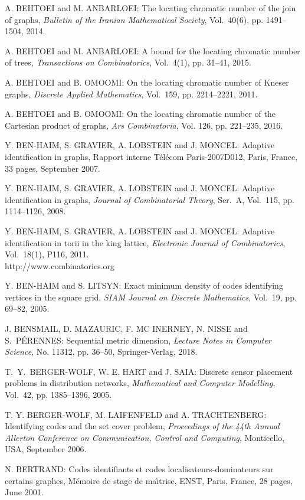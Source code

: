 \begin{thebibliography}{999}
A. BEHTOEI and M. ANBARLOEI: The locating chromatic number of the join of graphs, {\it Bulletin of the Iranian Mathematical Society}, Vol.~40(6), pp. 1491--1504, 2014.

A. BEHTOEI and M. ANBARLOEI: A bound for the locating chromatic number of trees, {\it Transactions on Combinatorics}, Vol.~4(1), pp. 31--41, 2015.

A. BEHTOEI and B. OMOOMI: On the locating chromatic number of Kneser graphs, {\it Discrete Applied Mathematics}, Vol.~159, pp. 2214--2221, 2011.

A. BEHTOEI and B. OMOOMI: On the locating chromatic number of the Cartesian product of graphs, {\it Ars Combinatoria}, Vol. 126, pp. 221--235, 2016.

Y. BEN-HAIM, S. GRAVIER, A. LOBSTEIN and J. MONCEL: Adaptive identification in graphs, Rapport interne T\'el\'ecom Paris-2007D012, Paris, France, 33 pages, September 2007.

Y. BEN-HAIM, S. GRAVIER, A. LOBSTEIN and J. MONCEL: Adaptive identification in graphs, {\it Journal of Combinatorial Theory}, Ser.~A, Vol.~115, pp. 1114--1126, 2008.

Y. BEN-HAIM, S. GRAVIER, A. LOBSTEIN and J. MONCEL: Adaptive identification in torii in the king lattice, {\it Electronic Journal of Combinatorics}, Vol.~18(1), P116, 2011.\\
http://www.combinatorics.org

Y. BEN-HAIM and S. LITSYN: Exact minimum density of codes identifying vertices in the square grid, {\it SIAM Journal on Discrete Mathematics}, Vol.~19, pp. 69--82, 2005.

J. BENSMAIL, D. MAZAURIC, F. MC INERNEY, N. NISSE and S.~P\'E\-RENNES: Sequential metric dimension, {\it Lecture Notes in Computer Science}, No. 11312, pp. 36--50, Springer-Verlag, 2018.

T.~Y.~BERGER-WOLF, W. E. HART and J. SAIA: Discrete sensor placement problems in distribution networks, {\it Mathematical and Computer Modelling}, Vol.~42, pp. 1385--1396, 2005.

T. Y. BERGER-WOLF, M. LAIFENFELD and A. TRACHTENBERG: Identifying codes and the set cover problem, {\it Proceedings of the 44th Annual Allerton Conference on Communication, Control and Computing}, Monticello, USA, September 2006.

N. BERTRAND: Codes identifiants et codes localisateurs-dominateurs sur certains graphes, M\'emoire de stage de ma\^{\i}trise, ENST, Paris, France, 28 pages, June 2001.


\end{thebibliography}
